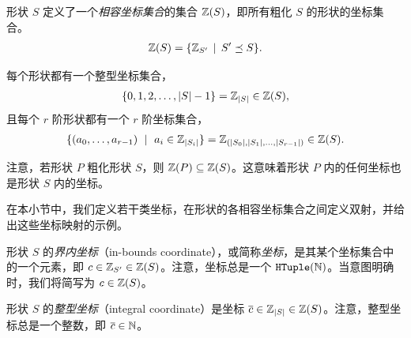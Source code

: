 \begin{definition}
形状 $S$ 定义了一个{\em 相容坐标集合}的集合 $\mathbb{Z}(S)$，即所有粗化 $S$ 的形状的坐标集合。
\begin{align}
\mathbb{Z}(S) = \{\mathbb{Z}_{S'} \, \mid \, S' \preceq S\}.
\end{align}
\end{definition}

每个形状都有一个整型坐标集合，
\begin{align*}
\{ 0, 1, 2, \ldots, \left| {S} \right|-1 \} = \mathbb{Z}_{\left| {S} \right|} \in \mathbb{Z}(S),
\end{align*}
且每个 $r$ 阶形状都有一个 $r$ 阶坐标集合，
\begin{align*}
\{ (a_0, \ldots, a_{r-1}) \ \mid \ a_i \in \mathbb{Z}_{\left| {S_i} \right|} \} = \mathbb{Z}_{(\left| {S_0} \right|, \left| {S_1} \right|, \ldots, \left| {S_{r-1}} \right|)} \in \mathbb{Z}(S).
\end{align*}

注意，若形状 $P$ 粗化形状 $S$，则 $\mathbb{Z}(P) \subseteq \mathbb{Z}(S)$。这意味着形状 $P$ 内的任何坐标也是形状 $S$ 内的坐标。







在本小节中，我们定义若干类坐标，在形状的各相容坐标集合之间定义双射，并给出这些坐标映射的示例。

\begin{definition}
形状 $S$ 的\emph{界内坐标}（in-bounds coordinate），或简称{\em 坐标}，是其某个坐标集合中的一个元素，即 $c \in \mathbb{Z}_{S'} \in \mathbb{Z}(S)$。注意，坐标总是一个 $\texttt{HTuple}(\mathbb{N})$。当意图明确时，我们将简写为 $c \in \mathbb{Z}(S)$。
\end{definition}

\begin{definition}
形状 $S$ 的\emph{整型坐标}（integral coordinate）是坐标 $\overline{c} \in \mathbb{Z}_{\left| {S} \right|} \in \mathbb{Z}(S)$。注意，整型坐标总是一个整数，即 $\overline{c} \in \mathbb{N}$。
\end{definition}

